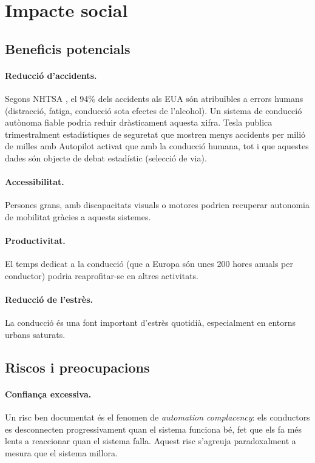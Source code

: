 \documentclass[11pt,a4paper]{article}
\begin{document}
\section{Impacte social}

\subsection{Beneficis potencials}

\paragraph{Reducció d'accidents.} Segons NHTSA \cite{nhtsa2024}, el 94\% dels accidents als EUA són atribuïbles a errors humans (distracció, fatiga, conducció sota efectes de l'alcohol). Un sistema de conducció autònoma fiable podria reduir dràsticament aquesta xifra. Tesla publica trimestralment estadístiques de seguretat que mostren menys accidents per milió de milles amb Autopilot activat que amb la conducció humana, tot i que aquestes dades són objecte de debat estadístic (selecció de via).

\paragraph{Accessibilitat.} Persones grans, amb discapacitats visuals o motores podrien recuperar autonomia de mobilitat gràcies a aquests sistemes.

\paragraph{Productivitat.} El temps dedicat a la conducció (que a Europa són unes 200 hores anuals per conductor) podria reaprofitar-se en altres activitats.

\paragraph{Reducció de l'estrès.} La conducció és una font important d'estrès quotidià, especialment en entorns urbans saturats.

\subsection{Riscos i preocupacions}

\paragraph{Confiança excessiva.} Un risc ben documentat \cite{koopman2023} és el fenomen de \emph{automation complacency}: els conductors es desconnecten progressivament quan el sistema funciona bé, fet que els fa més lents a reaccionar quan el sistema falla. Aquest risc s'agreuja paradoxalment a mesura que el sistema millora.
\end{document}
